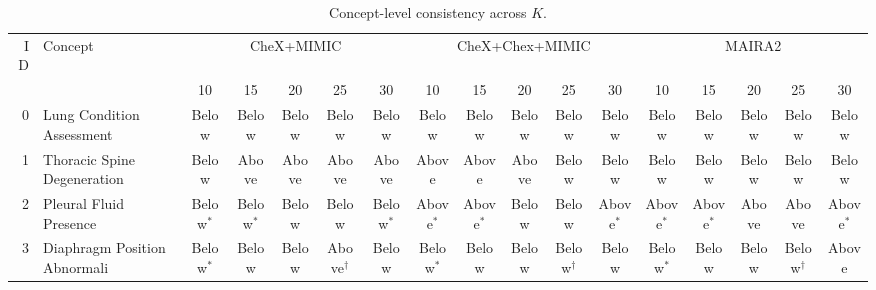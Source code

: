 \begin{landscape}
\begin{table}[p]
\centering
\footnotesize
\setlength{\tabcolsep}{3pt}
\caption{Concept-level consistency across $K$.}
\label{tab:supp_concept_consistency_k}
\begin{tabular}{rlccccccccccccccc}
\toprule
ID & Concept & \multicolumn{5}{c}{CheX+MIMIC} & \multicolumn{5}{c}{CheX+Chex+MIMIC} & \multicolumn{5}{c}{MAIRA2} \\
\cmidrule(lr){3-7} \cmidrule(lr){8-12} \cmidrule(lr){13-17}
 &  & 10 & 15 & 20 & 25 & 30 & 10 & 15 & 20 & 25 & 30 & 10 & 15 & 20 & 25 & 30 \\
\midrule
0 & Lung Condition Assessment & \cellcolor{red!15}Below & \cellcolor{red!15}Below & \cellcolor{red!15}Below & \cellcolor{red!15}Below & \cellcolor{red!15}Below & \cellcolor{red!15}Below & \cellcolor{red!15}Below & \cellcolor{red!15}Below & \cellcolor{red!15}Below & \cellcolor{red!15}Below & \cellcolor{red!15}Below & \cellcolor{red!15}Below & \cellcolor{red!15}Below & \cellcolor{red!15}Below & \cellcolor{red!15}Below \\
1 & Thoracic Spine Degeneration & \cellcolor{red!15}Below & \cellcolor{blue!15}Above & \cellcolor{blue!15}Above & \cellcolor{blue!15}Above & \cellcolor{blue!15}Above & \cellcolor{blue!15}Above & \cellcolor{blue!15}Above & \cellcolor{blue!15}Above & \cellcolor{red!15}Below & \cellcolor{red!15}Below & \cellcolor{red!15}Below & \cellcolor{red!15}Below & \cellcolor{red!15}Below & \cellcolor{red!15}Below & \cellcolor{red!15}Below \\
2 & Pleural Fluid Presence & \cellcolor{red!15}Below$^{\ast}$ & \cellcolor{red!15}Below$^{\ast}$ & \cellcolor{red!15}Below & \cellcolor{red!15}Below & \cellcolor{red!15}Below$^{\ast}$ & \cellcolor{blue!15}Above$^{\ast}$ & \cellcolor{blue!15}Above$^{\ast}$ & \cellcolor{red!15}Below & \cellcolor{red!15}Below & \cellcolor{blue!15}Above$^{\ast}$ & \cellcolor{blue!15}Above$^{\ast}$ & \cellcolor{blue!15}Above$^{\ast}$ & \cellcolor{blue!15}Above & \cellcolor{blue!15}Above & \cellcolor{blue!15}Above$^{\ast}$ \\
3 & Diaphragm Position Abnormali & \cellcolor{red!15}Below$^{\ast}$ & \cellcolor{red!15}Below & \cellcolor{red!15}Below & \cellcolor{blue!15}Above$^{\dagger}$ & \cellcolor{red!15}Below & \cellcolor{red!15}Below$^{\ast}$ & \cellcolor{red!15}Below & \cellcolor{red!15}Below & \cellcolor{red!15}Below$^{\dagger}$ & \cellcolor{red!15}Below & \cellcolor{red!15}Below$^{\ast}$ & \cellcolor{red!15}Below & \cellcolor{red!15}Below & \cellcolor{red!15}Below$^{\dagger}$ & \cellcolor{blue!15}Above \\

\end{tabular}
\end{table}
\end{landscape}
